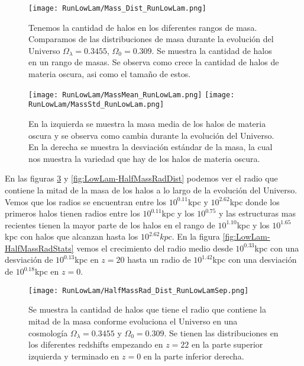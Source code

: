\begin{figure}[H]
    \centering
    \texttt{[image: RunLowLam/Mass\_Dist\_RunLowLam.png]}
    \caption[Comparación de distribución de masa]{\footnotesize Tenemos la cantidad de halos en los diferentes rangos de masa. Comparamos de las distribuciones de masa durante la evolución del Universo $\Omega_\lambda = 0.3455$, $\Omega_0 = 0.309$. Se muestra la cantidad de halos en un rango de masas. Se observa como crece la cantidad de halos de materia oscura, asi como el tamaño de estos.}
    \label{fig:LowLam-MassDist}
\end{figure}

\begin{figure}[H]
    \centering
    \texttt{[image: RunLowLam/MassMean\_RunLowLam.png]}
    \texttt{[image: RunLowLam/MassStd\_RunLowLam.png]}
    \caption[Media y desviación estándar de la distribución de masa]{\footnotesize En la izquierda se muestra la masa media de los halos de materia oscura y se observa como cambia durante la evolución del Universo. En la derecha se muestra la desviación estándar de la masa, la cual nos muestra la variedad que hay de los halos de materia oscura.}
    \label{fig:LowLam-MassStats}
\end{figure}

En las figuras \ref{fig:LowLam-HalfMassRadDistSep} y \ref{fig:LowLam-HalfMassRadDist} podemos ver el radio que contiene la mitad de la masa de los halos a lo largo de la evolución del Universo. Vemos que los radios se encuentran entre los $10^{0.11}$kpc y $10^{2.62}$kpc donde los primeros halos tienen radios entre los $10^{0.11}$kpc y los $10^{0.75}$ y las estructuras mas recientes tienen la mayor parte de los halos en el rango de $10^{1.10}$kpc y los $10^{1.65}$kpc con halos que alcanzan hasta los $10^{2.62}kpc$. En la figura \ref{fig:LowLam-HalfMassRadStats} vemos el crecimiento del radio medio desde $10^{0.33}$kpc con una desviación de $10^{0.13}$kpc en $z=20$ hasta un radio de $10^{1.42}$kpc con una desviación de $10^{0.18}$kpc en $z=0$.

\begin{figure}[H]
    \centering
    \texttt{[image: RunLowLam/HalfMassRad\_Dist\_RunLowLamSep.png]}
    \caption[Radio que contiene la mitad de la masa]{\footnotesize Se muestra la cantidad de halos que tiene el radio que contiene la mitad de la masa conforme evoluciona el Universo en una cosmología $\Omega_\lambda = 0.3455$ y $\Omega_0 = 0.309$. Se tienen las distribuciones en los diferentes redshifts empezando en $z=22$ en la parte superior izquierda y terminado en $z=0$ en la parte inferior derecha.}
    \label{fig:LowLam-HalfMassRadDistSep}
\end{figure}

